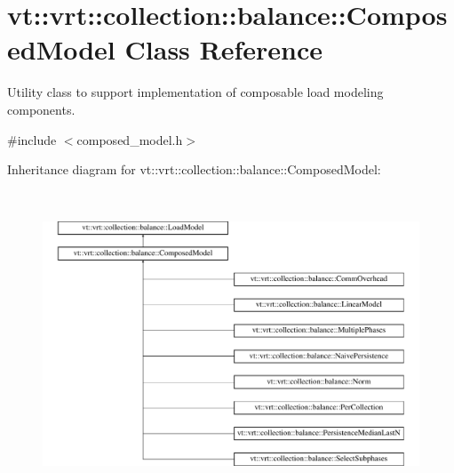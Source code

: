 \hypertarget{classvt_1_1vrt_1_1collection_1_1balance_1_1_composed_model}{}\section{vt\+:\+:vrt\+:\+:collection\+:\+:balance\+:\+:Composed\+Model Class Reference}
\label{classvt_1_1vrt_1_1collection_1_1balance_1_1_composed_model}


Utility class to support implementation of composable load modeling components.  




{\ttfamily \#include $<$composed\+\_\+model.\+h$>$}

Inheritance diagram for vt\+:\+:vrt\+:\+:collection\+:\+:balance\+:\+:Composed\+Model\+:\begin{figure}[H]
\begin{center}
\leavevmode
\includegraphics[height=9.090909cm]{classvt_1_1vrt_1_1collection_1_1balance_1_1_composed_model}
\end{center}
\end{figure}
